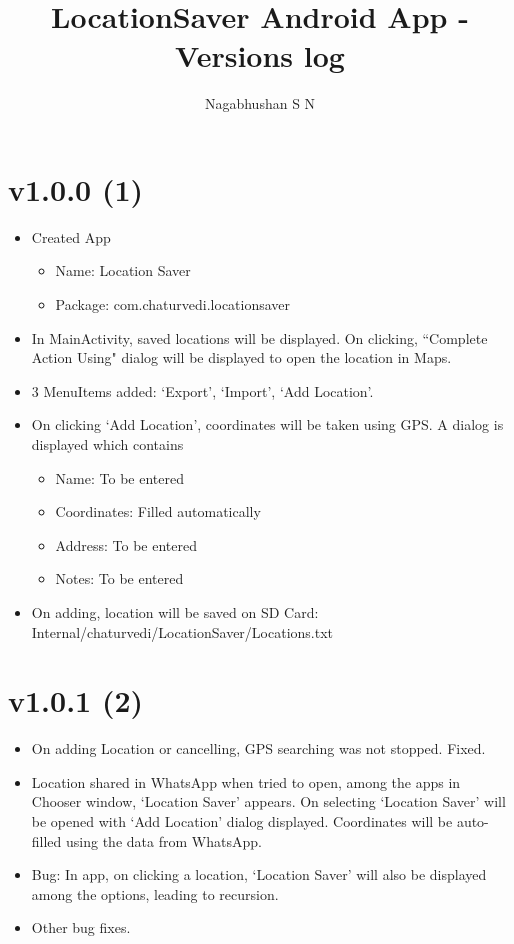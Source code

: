 \documentclass{article}
\title{LocationSaver Android App - Versions log}
\author{Nagabhushan S N}
\begin{document}
    \maketitle
    \tableofcontents
    \newpage


    \section{v1.0.0 (1)}\label{sec:1}
    \begin{itemize}
        \item Created App
        \begin{itemize}
            \item Name: Location Saver
            \item Package: com.chaturvedi.locationsaver
        \end{itemize}
        \item In MainActivity, saved locations will be displayed. On clicking, ``Complete Action Using" dialog will be displayed to open the location in Maps.
        \item 3 MenuItems added: `Export', `Import', `Add Location'.
        \item On clicking `Add Location', coordinates will be taken using GPS. A dialog is displayed which contains
        \begin{itemize}
            \item Name: To be entered
            \item Coordinates: Filled automatically
            \item Address: To be entered
            \item Notes: To be entered
        \end{itemize}
        \item On adding, location will be saved on SD Card: Internal/chaturvedi/LocationSaver/Locations.txt
    \end{itemize}


    \section{v1.0.1 (2)}\label{sec:2}
    \begin{itemize}
        \item On adding Location or cancelling, GPS searching was not stopped. Fixed.
        \item Location shared in WhatsApp when tried to open, among the apps in Chooser window, `Location Saver' appears. On selecting `Location Saver' will be opened with `Add Location' dialog displayed. Coordinates will be auto-filled using the data from WhatsApp.
        \item Bug: In app, on clicking a location, `Location Saver' will also be displayed among the options, leading to recursion.
        \item Other bug fixes.
    \end{itemize}
\end{document}
